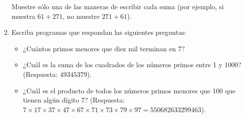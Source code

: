 \begin{enumerate}
  Muestre sólo una de las maneras de escribir cada suma (por ejemplo, si
  muestra \(61 + 271\), no muestre \(271 + 61\)).

\item
  Escriba programas que respondan las siguientes preguntas:

  \begin{itemize}
  \item
    ¿Cuántos primos menores que diez mil terminan en 7?
  \item
    ¿Cuál es la suma de los cuadrados de los números primos entre 1 y
    1000? (Respuesta: \(49345379\)).
  \item
    ¿Cuál es el producto de todos los números primos menores que 100 que
    tienen algún dígito 7? (Respuesta:
    \(7 × 17 × 37 × 47 × 67 × 71 × 73 × 79 × 97 = 550682633299463\)).
  \end{itemize}
\end{enumerate}

